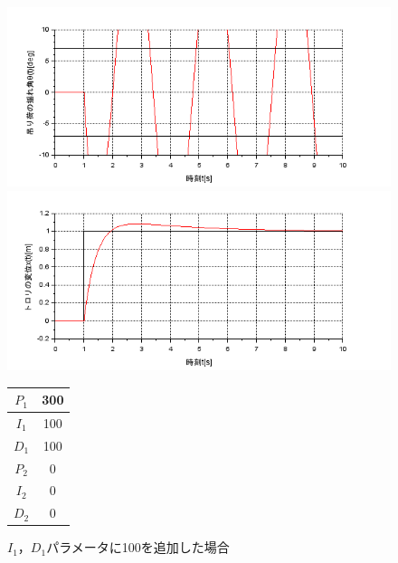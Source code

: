 \documentclass[dvipdfmx,titlepage,a4j]{jsarticle}  %
\begin{document}
\begin{figure}[H]
  \begin{minipage}{4.5cm}
    \centering
    \includegraphics[keepaspectratio, scale=0.35]{../graph/crane/ang-P1-300-I1-100-D1-0-P2-0-I2-0-D2-0.png}
  \end{minipage}
  \hfill
  \begin{minipage}{4.5cm}
    \centering
    \includegraphics[keepaspectratio, scale=0.35]{../graph/crane/po-P1-300-I1-100-D1-0-P2-0-I2-0-D2-0.png}
  \end{minipage}
  \hfill
  \begin{minipage}{3cm}
    \begin{center}
      \begin{tabular}{c|c}
        \hline
        $P_1$ & 300 \\ \hline
        $I_1$ & 100 \\ \hline
        $D_1$ & 100 \\ \hline
        $P_2$ & 0   \\ \hline
        $I_2$ & 0   \\ \hline
        $D_2$ & 0   \\
        \hline
      \end{tabular}
    \end{center}
  \end{minipage}
  \hfill
  \caption{$I_1$，$D_1$パラメータに100を追加した場合}
  \label{fig:crane:6}
\end{figure}
\end{document}
